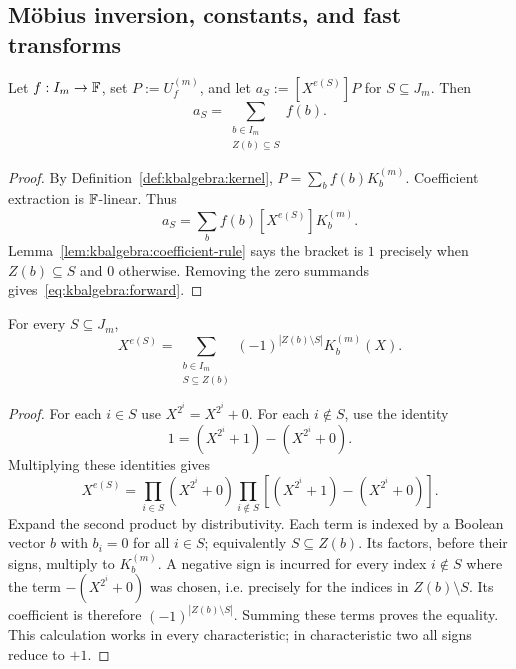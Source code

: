 \subsection{M\"obius inversion, constants, and fast transforms}\label{sec:kbalgebra:transforms}

\begin{lemma}\label{lem:kbalgebra:forward}
Let $f:I_m\to\mathbb{F}$, set $P:=U_f^{(m)}$, and let $a_S:=[X^{e(S)}]P$ for $S\subseteq J_m$. Then
\begin{equation}\label{eq:kbalgebra:forward}
 \boxed{a_S=\sum_{\substack{b\in I_m\\Z(b)\subseteq S}}f(b).}
\end{equation}
\end{lemma}
\begin{proof}
By Definition~\ref{def:kbalgebra:kernel}, $P=\sum_bf(b)K_b^{(m)}$. Coefficient extraction is $\mathbb{F}$-linear. Thus
\[
 a_S=\sum_b f(b)[X^{e(S)}]K_b^{(m)}.
\]
Lemma~\ref{lem:kbalgebra:coefficient-rule} says the bracket is $1$ precisely when $Z(b)\subseteq S$ and $0$ otherwise. Removing the zero summands gives~\eqref{eq:kbalgebra:forward}.
\end{proof}

\begin{lemma}\label{lem:kbalgebra:monomial-inverse}
For every $S\subseteq J_m$,
\begin{equation}\label{eq:kbalgebra:monomial-inverse}
 \boxed{X^{e(S)}=\sum_{\substack{b\in I_m\\S\subseteq Z(b)}}
 (-1)^{|Z(b)\setminus S|}K_b^{(m)}(X).}
\end{equation}
\end{lemma}
\begin{proof}
For each $i\in S$ use $X^{2^i}=X^{2^i}+0$. For each $i\notin S$, use the identity
\[
 1=(X^{2^i}+1)-(X^{2^i}+0).
\]
Multiplying these identities gives
\[
 X^{e(S)}=\prod_{i\in S}(X^{2^i}+0)
 \prod_{i\notin S}\left[(X^{2^i}+1)-(X^{2^i}+0)\right].
\]
Expand the second product by distributivity. Each term is indexed by a Boolean vector $b$ with $b_i=0$ for all $i\in S$; equivalently $S\subseteq Z(b)$. Its factors, before their signs, multiply to $K_b^{(m)}$. A negative sign is incurred for every index $i\notin S$ where the term $-(X^{2^i}+0)$ was chosen, i.e. precisely for the indices in $Z(b)\setminus S$. Its coefficient is therefore $(-1)^{|Z(b)\setminus S|}$. Summing these terms proves the equality. This calculation works in every characteristic; in characteristic two all signs reduce to $+1$.
\end{proof}

